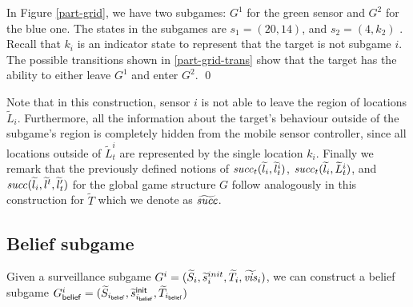 \begin{example}
In Figure \ref{part-grid}, we have two subgames: $G^1$ for the green sensor and $G^2$ for the blue one. The states in the subgames are $s_1 = (20,14)$, and $s_2 = (4,k_2)$ . Recall that $k_i$ is an indicator state to represent that the target is not subgame $i$. The possible transitions shown in \ref{part-grid-trans} show that the target has the ability to either leave $G^1$ and enter $G^2$. 
\qed
\end{example}

Note that in this construction, sensor $i$ is not able to leave the region of locations $\widetilde{L}_i$. Furthermore, all the information about the target's behaviour outside of  the subgame's region is completely hidden from the mobile sensor controller, since all locations outside of  $\widetilde{L}_t^i$ are represented by the single location $k_i$.
Finally we remark that the previously defined notions of $\mathit{succ}_t(\widetilde{l}_i,\widetilde{l}^i_{t})$, $\mathit{succ}_t(\widetilde{l}_i,\widetilde{L}^i_{t})$, and $\mathit{succ}(\widetilde{l}_i,\widetilde{l}^{t},\widetilde{l}_{t}')$ for the global game structure $G$ follow analogously in this construction for $\widetilde{T}$ which we denote as $\widetilde{\mathit{succ}}$.

\subsection{Belief subgame}
Given a surveillance subgame $G^{i} = (\widetilde{S}_i,\widetilde{s}_i^{init},\widetilde{T}_i,\widetilde{\mathit{vis}}_i)$, we can construct a belief subgame $G^{i}_{\mathsf{belief}} = (\widetilde{S}_{i_{\mathsf{belief}}},\widetilde{s}^{\mathsf{init}}_{i_{\mathsf{belief}}},\widetilde{T}_{i_{\mathsf{belief}}})$ 

